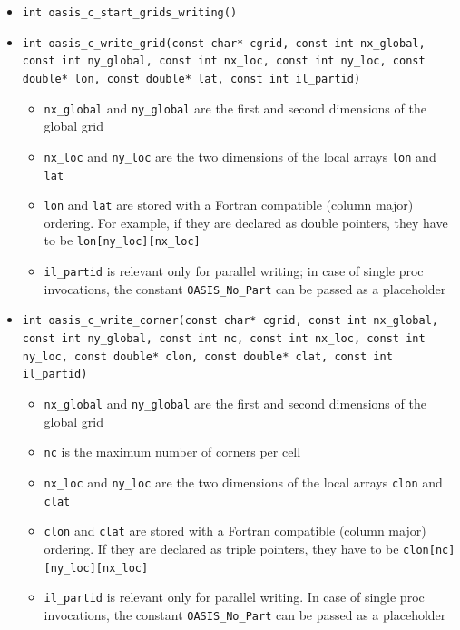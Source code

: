 \begin{itemize}
\vspace{0.2cm}
\item {\tt int oasis\_c\_start\_grids\_writing()}

\vspace{0.2cm}
\item {\tt int oasis\_c\_write\_grid(const char* cgrid, const int nx\_global, const int ny\_global, const int nx\_loc, const int ny\_loc, const double* lon, const double* lat, const int il\_partid)}
  \begin{itemize}/local
    \item {\tt nx\_global} and {\tt ny\_global} are the first and second dimensions
      of the global grid
    \item {\tt nx\_loc} and {\tt ny\_loc} are the two dimensions
      of the local arrays {\tt lon} and {\tt lat}
    \item {\tt lon} and {\tt lat} are stored with a Fortran compatible
      (column major) ordering. For example, if they are declared as double
      pointers, they have to be {\tt lon[ny\_loc][nx\_loc]}
    \item {\tt il\_partid} is relevant only for parallel writing; in case
      of single proc invocations, the constant {\tt OASIS\_No\_Part}
      can be passed as a placeholder
  \end{itemize}

\vspace{0.2cm}
\item {\tt int oasis\_c\_write\_corner(const char* cgrid, const int nx\_global, const int ny\_global, const int nc, const int nx\_loc, const int ny\_loc, const double* clon, const double* clat, const int il\_partid)}
  \begin{itemize}
    \item {\tt nx\_global} and {\tt ny\_global} are the first and second dimensions
      of the global grid
    \item {\tt nc} is the maximum number of corners per cell
    \item {\tt nx\_loc} and {\tt ny\_loc} are the two dimensions
      of the local arrays {\tt clon} and {\tt clat}
    \item {\tt clon} and {\tt clat} are stored with a Fortran compatible
      (column major) ordering. If they are declared as triple
      pointers, they have to be {\tt clon[nc][ny\_loc][nx\_loc]}
    \item {\tt il\_partid} is relevant only for parallel writing. In case
      of single proc invocations, the constant {\tt OASIS\_No\_Part}
      can be passed as a placeholder
  \end{itemize}


\end{itemize}
